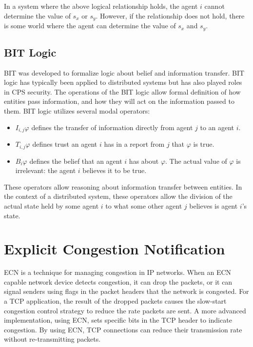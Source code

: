 In a system where the above logical relationship holds, the agent $i$ cannot determine the value of $s_x$ or $s_y$. However, if the relationship does not hold, there is some world where the agent can determine the value of $s_x$ and $s_y$.

\subsection{BIT Logic}


\ac{BIT} was developed to formalize logic about belief and information transfer.
\ac{BIT} logic has typically been applied to distributed systems but has also played roles in \ac{CPS} security.
The operations of the \ac{BIT} logic allow formal definition of how entities pass information, and how they will act on the information passed to them.
\ac{BIT} logic utilizes several modal operators:

\begin{itemize}
\item $I_{i,j} \varphi$ defines the transfer of information directly from agent $j$ to an agent $i$. 
\item $T_{i,j} \varphi$ defines trust an agent $i$ has in a report from $j$ that $\varphi$ is true.
\item $B_i \varphi$ defines the belief that an agent $i$ has about $\varphi$. The actual value of $\varphi$ is irrelevant: the agent $i$ believes it to be true.
\end{itemize}

These operators allow reasoning about information transfer between entities.
In the context of a distributed system, these operators allow the division of the actual state held by some agent $i$ to what some other agent $j$ believes is agent $i$'s state.

\section{Explicit Congestion Notification}

\ac{ECN} is a technique for managing congestion in IP networks. 
When an \ac{ECN} capable network device detects congestion, it can drop the packets, or it can signal senders using flags in the packet headers that the network is congested.
For a TCP application, the result of the dropped packets causes the slow-start congestion control strategy to reduce the rate packets are sent.
A more advanced implementation, using \ac{ECN}, sets specific bits in the TCP header to indicate congestion.
By using \ac{ECN}, TCP connections can reduce their transmission rate without re-transmitting packets.

